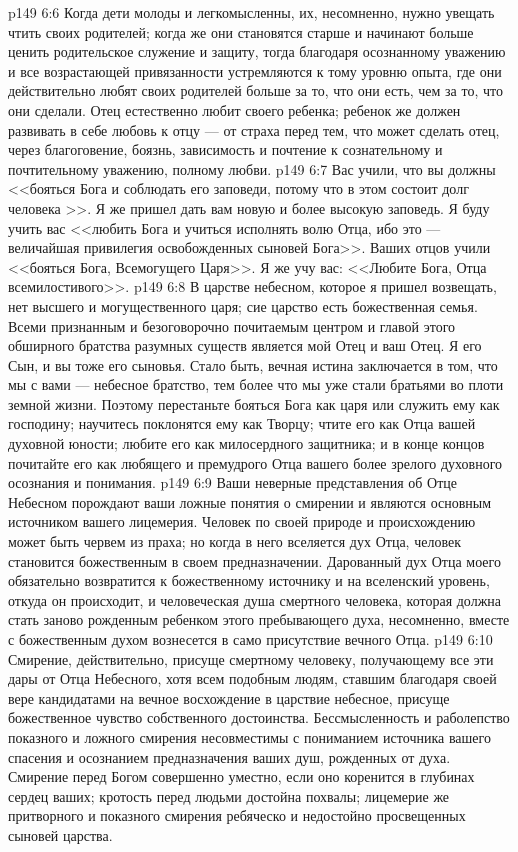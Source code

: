 \vs p149 6:6 Когда дети молоды и легкомысленны, их, несомненно, нужно увещать чтить своих родителей; когда же они становятся старше и начинают больше ценить родительское служение и защиту, тогда благодаря осознанному уважению и все возрастающей привязанности устремляются к тому уровню опыта, где они действительно любят своих родителей больше за то, что они есть, чем за то, что они сделали. Отец естественно любит своего ребенка; ребенок же должен развивать в себе любовь к отцу --- от страха перед тем, что может сделать отец, через благоговение, боязнь, зависимость и почтение к сознательному и почтительному уважению, полному любви.
\vs p149 6:7 Вас учили, что вы должны <<бояться Бога и соблюдать его заповеди, потому что в этом состоит долг человека >>. Я же пришел дать вам новую и более высокую заповедь. Я буду учить вас <<любить Бога и учиться исполнять волю Отца, ибо это --- величайшая привилегия освобожденных сыновей Бога>>. Ваших отцов учили <<бояться Бога, Всемогущего Царя>>. Я же учу вас: <<Любите Бога, Отца всемилостивого>>.
\vs p149 6:8 В царстве небесном, которое я пришел возвещать, нет высшего и могущественного царя; сие царство есть божественная семья. Всеми признанным и безоговорочно почитаемым центром и главой этого обширного братства разумных существ является мой Отец и ваш Отец. Я его Сын, и вы тоже его сыновья. Стало быть, вечная истина заключается в том, что мы с вами --- небесное братство, тем более что мы уже стали братьями во плоти земной жизни. Поэтому перестаньте бояться Бога как царя или служить ему как господину; научитесь поклонятся ему как Творцу; чтите его как Отца вашей духовной юности; любите его как милосердного защитника; и в конце концов почитайте его как любящего и премудрого Отца вашего более зрелого духовного осознания и понимания.
\vs p149 6:9 Ваши неверные представления об Отце Небесном порождают ваши ложные понятия о смирении и являются основным источником вашего лицемерия. Человек по своей природе и происхождению может быть червем из праха; но когда в него вселяется дух Отца, человек становится божественным в своем предназначении. Дарованный дух Отца моего обязательно возвратится к божественному источнику и на вселенский уровень, откуда он происходит, и человеческая душа смертного человека, которая должна стать заново рожденным ребенком этого пребывающего духа, несомненно, вместе с божественным духом вознесется в само присутствие вечного Отца.
\vs p149 6:10 Смирение, действительно, присуще смертному человеку, получающему все эти дары от Отца Небесного, хотя всем подобным людям, ставшим благодаря своей вере кандидатами на вечное восхождение в царствие небесное, присуще божественное чувство собственного достоинства. Бессмысленность и раболепство показного и ложного смирения несовместимы с пониманием источника вашего спасения и осознанием предназначения ваших душ, рожденных от духа. Смирение перед Богом совершенно уместно, если оно коренится в глубинах сердец ваших; кротость перед людьми достойна похвалы; лицемерие же притворного и показного смирения ребяческо и недостойно просвещенных сыновей царства.
